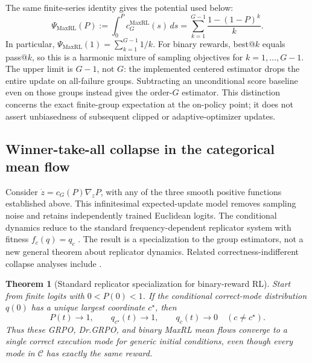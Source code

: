 \documentclass{article}
\newcommand{\1}{\mathbf 1}
\newtheorem{theorem}[lemma]{Theorem}
\theoremstyle{remark}
\theoremstyle{definition}
\theoremstyle{plain}
\begin{document}
The same finite-series identity gives the potential used below:
\begin{equation}
 \Psi_{\mathrm{MaxRL}}(P)
 :=\int_0^P c_G^{\mathrm{MaxRL}}(s)\,ds
 =\sum_{k=1}^{G-1}\frac{1-(1-P)^k}{k}.
 \label{eq:maxrl-potential-finite-sum}
\end{equation}
In particular, $\Psi_{\mathrm{MaxRL}}(1)=\sum_{k=1}^{G-1}1/k$.
For binary rewards, best@\(k\) equals pass@\(k\), so this is a harmonic
mixture of sampling objectives for $k=1,\ldots,G-1$. The upper limit is
$G-1$, not $G$: the implemented centered estimator drops the entire update
on all-failure groups. Subtracting an unconditional score baseline even on
those groups instead gives the order-$G$ estimator. This distinction concerns
the exact finite-group expectation at the on-policy point; it does not assert
unbiasedness of subsequent clipped or adaptive-optimizer updates.


\subsection{Winner-take-all collapse in the categorical mean flow}
\label{app:theory-collapse}

Consider $\dot z=c_G(P)\nabla_zP$, with any of the three smooth positive
functions established above. This infinitesimal expected-update model removes
sampling noise and retains independently trained Euclidean logits. The
conditional dynamics reduce to the standard frequency-dependent replicator
system with fitness $f_c(q)=q_c$ \citep{hofbauer1998evolutionary}. The result is
a specialization to the group estimators, not a new general theorem about
replicator dynamics. Related correctness-indifferent collapse analyses include
\citet{sinha2026expected,lochab2026ucpo}.

\begin{theorem}[Standard replicator specialization for binary-reward RL]
\label{thm:grpo-collapse}
Start from finite logits with $0<P(0)<1$. If the conditional correct-mode
distribution $q(0)$ has a unique largest coordinate $c^\star$, then
\[
  P(t)\longrightarrow1,
  \qquad
  q_{c^\star}(t)\longrightarrow1,
  \qquad
  q_c(t)\longrightarrow0\quad(c\ne c^\star).
\]
Thus these GRPO, Dr.GRPO, and binary MaxRL mean flows converge to a single
correct execution mode for generic initial conditions, even though every mode
in $\mathcal C$ has exactly the same reward.
\end{theorem}
\end{document}
